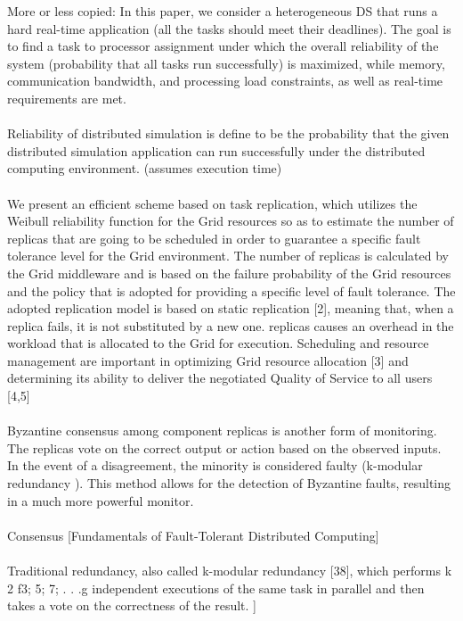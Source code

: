 \documentclass{cslthse-msc}
\begin{document}
% 
More or less copied:
In this paper, we consider a heterogeneous DS that runs a hard real-time application (all the tasks should meet their deadlines). The goal is to find a task to processor assignment under which the overall reliability of the system (probability that all tasks run successfully) is maximized, while memory, communication bandwidth, and processing load constraints, as well as real-time requirements are met. \cite{optTaskAllocationForMaxRel}
\\\\
Reliability of distributed simulation is define to be the probability that the given distributed simulation application can run successfully under the distributed computing environment. (assumes execution time) \cite{relModelDistSimSystem}
\\\\
We present an efficient scheme based on task replication, which utilizes the Weibull reliability function for the Grid resources so as to estimate the number of replicas that are going to be scheduled in order to guarantee a specific fault tolerance level for the Grid environment. The number of replicas is calculated by the Grid middleware and is based on the failure probability of the Grid resources and the policy that is adopted for providing a specific level of fault tolerance. The adopted replication model is based on static replication [2], meaning that, when a replica fails, it is not substituted by a new one. replicas causes an overhead in the workload that is allocated to the Grid for execution. Scheduling and resource management are important in optimizing Grid resource allocation [3] and determining its ability to deliver the negotiated Quality of Service to all users [4,5] \cite{effTaskReplMobGrid}
\\\\
Byzantine consensus among component replicas is another form of monitoring. The replicas vote on the correct output or action based on the observed inputs. In the event of a disagreement, the minority is considered faulty (k-modular redundancy \cite{selfAdaptRel}). This method allows for the detection of Byzantine faults, resulting in a much more powerful monitor.  \cite{surveyFaultParallel}
\\\\
Consensus [Fundamentals of Fault-Tolerant Distributed Computing]
\\\\
Traditional redundancy, also called k-modular redundancy [38], which performs k 2 f3; 5; 7; . . .g independent executions of the same task in parallel and then takes a vote on the correctness of the result. ] 
\end{document}

